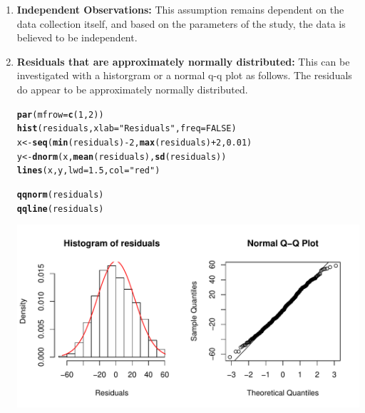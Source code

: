 \documentclass{report}\usepackage[]{graphicx}\usepackage[]{color}
\makeatletter
\def\maxwidth{ %
  \ifdim\Gin@nat@width>\linewidth
    \linewidth
  \else
    \Gin@nat@width
  \fi
}
\newcommand{\hlnum}[1]{\textcolor[rgb]{0.686,0.059,0.569}{#1}}%
\newcommand{\hlstr}[1]{\textcolor[rgb]{0.192,0.494,0.8}{#1}}%
\newcommand{\hlopt}[1]{\textcolor[rgb]{0,0,0}{#1}}%
\newcommand{\hlstd}[1]{\textcolor[rgb]{0.345,0.345,0.345}{#1}}%
\newcommand{\hlkwb}[1]{\textcolor[rgb]{0.69,0.353,0.396}{#1}}%
\newcommand{\hlkwc}[1]{\textcolor[rgb]{0.333,0.667,0.333}{#1}}%
\newcommand{\hlkwd}[1]{\textcolor[rgb]{0.737,0.353,0.396}{\textbf{#1}}}%
\newenvironment{kframe}{%
 \def\at@end@of@kframe{}%
 \ifinner\ifhmode%
  \def\at@end@of@kframe{\end{minipage}}%
  \begin{minipage}{\columnwidth}%
 \fi\fi%
 \def\FrameCommand##1{\hskip\@totalleftmargin \hskip-\fboxsep
 \colorbox{shadecolor}{##1}\hskip-\fboxsep
     \hskip-\linewidth \hskip-\@totalleftmargin \hskip\columnwidth}%
 \MakeFramed {\advance\hsize-\width
   \@totalleftmargin\z@ \linewidth\hsize
   \@setminipage}}%
 {\par\unskip\endMakeFramed%
 \at@end@of@kframe}
\newenvironment{knitrout}{}{} %
\makeatother
\begin{document}
\begin{enumerate}
\item \textbf{Independent Observations:} This assumption remains dependent on the data collection itself, and based on the parameters of the study, the data is believed to be independent.  

\item \textbf{Residuals that are approximately normally distributed:} This can be investigated with a historgram or a normal q-q plot as follows.  The residuals do appear to be approximately normally distributed.  
\begin{knitrout}
\color{fgcolor}\begin{kframe}
\begin{alltt}
\hlkwd{par}\hlstd{(}\hlkwc{mfrow} \hlstd{=} \hlkwd{c}\hlstd{(}\hlnum{1}\hlstd{,} \hlnum{2}\hlstd{))}
\hlkwd{hist}\hlstd{(residuals,} \hlkwc{xlab} \hlstd{=} \hlstr{"Residuals"}\hlstd{,} \hlkwc{freq} \hlstd{=} \hlnum{FALSE}\hlstd{)}
\hlstd{x} \hlkwb{<-} \hlkwd{seq}\hlstd{(}\hlkwd{min}\hlstd{(residuals)} \hlopt{-} \hlnum{2}\hlstd{,} \hlkwd{max}\hlstd{(residuals)} \hlopt{+} \hlnum{2}\hlstd{,} \hlnum{0.01}\hlstd{)}
\hlstd{y} \hlkwb{<-} \hlkwd{dnorm}\hlstd{(x,} \hlkwd{mean}\hlstd{(residuals),} \hlkwd{sd}\hlstd{(residuals))}
\hlkwd{lines}\hlstd{(x, y,} \hlkwc{lwd} \hlstd{=} \hlnum{1.5}\hlstd{,} \hlkwc{col} \hlstd{=} \hlstr{"red"}\hlstd{)}

\hlkwd{qqnorm}\hlstd{(residuals)}
\hlkwd{qqline}\hlstd{(residuals)}
\end{alltt}
\end{kframe}

{\centering \includegraphics[width=\maxwidth]{figure/unnamed-chunk-143-1} 

}



\end{knitrout}

\end{enumerate}
\end{document}
